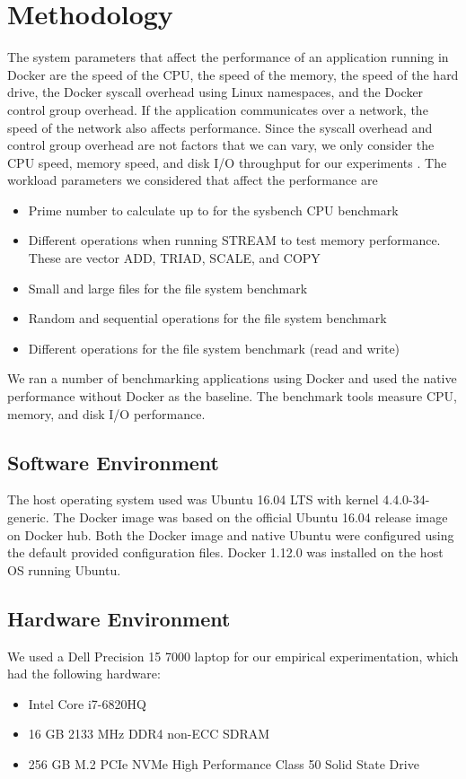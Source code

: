 \documentclass[11pt]{article}
\begin{document}
	\section{Methodology}
	The system parameters that affect the performance of an application running in Docker are the speed of the CPU, the speed of the memory, the speed of the hard drive, the Docker syscall overhead using Linux namespaces, and the Docker control group overhead. If the application communicates over a network, the speed of the network also affects performance. Since the syscall overhead and control group overhead are not factors that we can vary, we only consider the CPU speed, memory speed, and disk I/O throughput for our experiments \cite{bukh}. The workload parameters we considered that affect the performance are
	\begin{itemize}
		\item Prime number to calculate up to for the sysbench CPU benchmark
		\item Different operations when running STREAM to test memory performance. These are vector ADD, TRIAD, SCALE, and COPY
		\item Small and large files for the file system benchmark
		\item Random and sequential operations for the file system benchmark
		\item Different operations for the file system benchmark (read and write)
	\end{itemize}
	We ran a number of benchmarking applications using Docker and used the native performance without Docker as the baseline. The benchmark tools measure CPU, memory, and disk I/O performance.
	
	\subsection{Software Environment}
	The host operating system used was Ubuntu 16.04 LTS with kernel 4.4.0-34-generic.
	The Docker image was based on the official Ubuntu 16.04 release image on Docker hub.
	Both the Docker image and native Ubuntu were configured using the default provided configuration files. Docker 1.12.0 was installed on the host OS running Ubuntu.
	
	\subsection{Hardware Environment}
	We used a Dell Precision 15 7000 laptop for our empirical experimentation, which had the following hardware:
	\begin{itemize}
		\item Intel Core i7-6820HQ
		\item 16 GB 2133 MHz DDR4 non-ECC SDRAM
		\item 256 GB M.2 PCIe NVMe High Performance Class 50 Solid State Drive
	\end{itemize}
	
\end{document}
